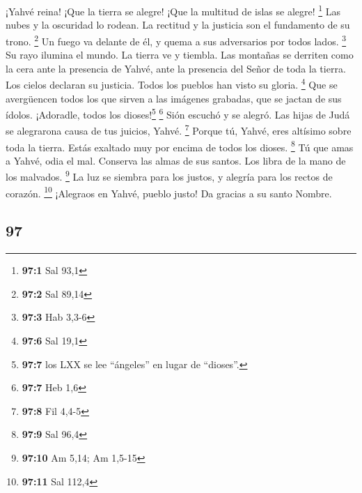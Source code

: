 \begin{paracol}{2}
 ¡Yahvé reina! ¡Que la tierra se alegre! ¡Que la multitud
de islas se alegre! \footnote{\textbf{97:1} Sal 93,1}  Las
nubes y la oscuridad lo rodean. La rectitud y la justicia son el
fundamento de su trono. \footnote{\textbf{97:2} Sal 89,14}
 Un fuego va delante de él, y quema a sus adversarios por
todos lados. \footnote{\textbf{97:3} Hab 3,3-6}  Su rayo
ilumina el mundo. La tierra ve y tiembla.  Las montañas se
derriten como la cera ante la presencia de Yahvé, ante la presencia del
Señor de toda la tierra.  Los cielos declaran su justicia.
Todos los pueblos han visto su gloria. \footnote{\textbf{97:6} Sal 19,1}
 Que se avergüencen todos los que sirven a las imágenes
grabadas, que se jactan de sus ídolos. ¡Adoradle, todos los
dioses!\footnote{\textbf{97:7} los LXX se lee ``ángeles'' en lugar de
  ``dioses''.} \footnote{\textbf{97:7} Heb 1,6}  Sión
escuchó y se alegró. Las hijas de Judá se alegrarona causa de tus
juicios, Yahvé. \footnote{\textbf{97:8} Fil 4,4-5}  Porque
tú, Yahvé, eres altísimo sobre toda la tierra. Estás exaltado muy por
encima de todos los dioses. \footnote{\textbf{97:9} Sal 96,4}
 Tú que amas a Yahvé, odia el mal. Conserva las almas de
sus santos. Los libra de la mano de los malvados. \footnote{\textbf{97:10}
  Am 5,14; Am 1,5-15}  La luz se siembra para los justos,
y alegría para los rectos de corazón. \footnote{\textbf{97:11} Sal 112,4}
 ¡Alegraos en Yahvé, pueblo justo! Da gracias a su santo
Nombre.

\switchcolumn
\begin{otherlanguage}{english}

\hypertarget{section-193}{%
\section{97}\label{section-193}}


\end{otherlanguage}
\end{paracol}
